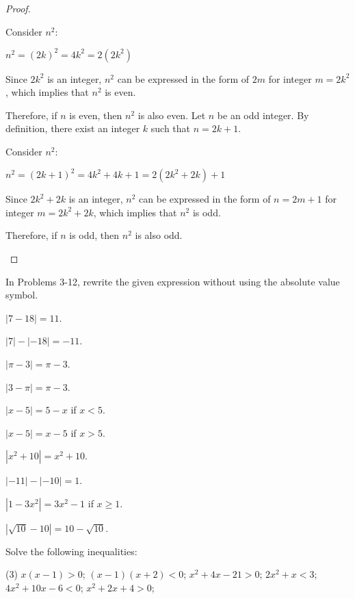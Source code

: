 \begin{questions}
\begin{proof}
\begin{tasks}
      Consider $n^2$:

      $n^2=(2k)^2=4k^2=2(2k^2)$

      Since $2k^2$ is an integer, $n^2$ can be expressed in the form of $2m$ for integer $m=2k^2$, which implies that $n^2$ is even.

      Therefore, if $n$ is even, then $n^2$ is also even.
      \task Let $n$ be an odd integer. By definition, there exist an integer $k$ such that $n=2k+1$.

      Consider $n^2$:

      $n^2=(2k+1)^2 = 4k^2+4k+1=2(2k^2+2k) + 1$

      Since $2k^2+2k$ is an integer, $n^2$ can be expressed in the form of $n = 2m+1$ for integer $m=2k^2+2k$, which implies that $n^2$ is odd.

      Therefore, if $n$ is odd, then $n^2$ is also odd.
    \end{tasks}
  \end{proof}
  In Problems 3-12, rewrite the given expression without using the absolute value symbol.
  \begin{solution}
    \item $ \left| 7 - 18 \right| = 11 $.
    \item $ \left| 7 \right| - \left| - 18 \right| = -11 $.
    \item $ \left| \pi - 3\right| = \pi - 3 $.
    \item $ \left| 3 - \pi \right| = \pi - 3 $.
    \item $ \left| x - 5 \right| = 5 - x $ if $ x < 5 $.
    \item $ \left| x - 5 \right| = x - 5 $ if $ x > 5 $.
    \item $ \left| x^2 + 10 \right| = x^2 + 10$.
    \item $ \left| -11 \right| - \left| -10 \right| = 1 $.
    \item $ \left| 1 - 3x^2 \right| = 3x^2 - 1 $ if $ x \geq 1 $.
    \item $ \left| \sqrt{10} - 10 \right| = 10 - \sqrt{10} $.
  \end{solution}
  \item Solve the following inequalities:
  \begin{tasks}(3)
    \task $ x(x - 1) > 0 $;
    \task $ (x - 1)(x + 2) < 0 $;
    \task $ x^2 + 4x - 21 > 0 $;
    \task $ 2x^2 + x < 3 $;
    \task $ 4x^2 + 10x - 6 < 0 $;
    \task $ x^2 + 2x + 4 > 0 $;
  \end{tasks}
  \begin{note}
\end{note}
\end{questions}

